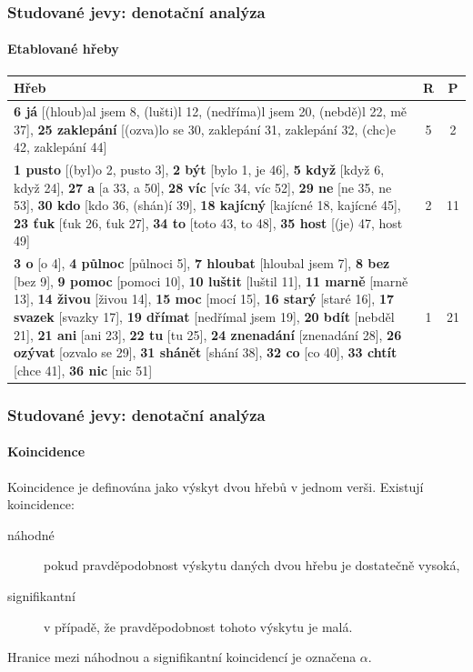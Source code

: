 \documentclass[12pt]{beamer}
\begin{document}
\begin{frame}
	\frametitle{Studované jevy: denotační analýza}
	\framesubtitle{Etablované hřeby}

	\vspace{-15pt}
	\begin{footnotesize}
		\begin {table}[H]
		\begin{center}
			\begin{tabular}{|p{10cm}|c|c|}
				\hline 
				\bfseries Hřeb & \bfseries R & \bfseries P \\ \hline
				\textbf{6 já} [(hloub)al jsem 8, (lušti)l 12, (nedříma)l jsem 20, (nebdě)l 22, mě 37], \textbf{25 zaklepání} [(ozva)lo se 30, zaklepání 31, zaklepání 32, (chc)e 42, zaklepání 44] 
				& 5 & 2 \\ \hline
				
				\textbf{1 pusto} [(byl)o 2, pusto 3], \textbf{2 být} [bylo 1, je 46], \textbf{5 když} [když 6, když 24], \textbf{27 a} [a 33, a 50], \textbf{28 víc} [víc 34, víc 52], \textbf{29 ne} [ne 35, ne 53], \textbf{30 kdo} [kdo 36, (shán)í 39], \textbf{18 kajícný} [kajícné 18, kajícné 45], \textbf{23 ťuk} [ťuk 26, ťuk 27], \textbf{34 to} [toto 43, to 48], \textbf{35 host} [(je) 47, host 49] 
				& 2 & 11\\ \hline
				
				\textbf{3 o} [o 4], \textbf{4 půlnoc} [půlnoci 5], \textbf{7 hloubat} [hloubal jsem 7], \textbf{8 bez} [bez 9], \textbf{9 pomoc} [pomoci 10], \textbf{10 luštit} [luštil 11], \textbf{11 marně} [marně 13], \textbf{14 živou} [živou 14], \textbf{15 moc} [mocí 15], \textbf{16 starý} [staré 16], \textbf{17 svazek} [svazky 17], \textbf{19 dřímat} [nedřímal jsem 19], \textbf{20 bdít} [nebděl 21], \textbf{21 ani} [ani 23], \textbf{22 tu} [tu 25], \textbf{24 znenadání} [znenadání 28], \textbf{26 ozývat} [ozvalo se 29], \textbf{31 shánět} [shání 38], \textbf{32 co} [co 40], \textbf{33 chtít} [chce 41], \textbf{36 nic} [nic 51]
				& 1 & 21 \\ \hline
		
			\end{tabular} 
		\end{center}
	\end{table}
	\end{footnotesize}
\end{frame}

\begin{frame}
	\frametitle{Studované jevy:  denotační analýza}
	\framesubtitle{Koincidence}

	Koincidence je definována jako výskyt dvou hřebů v jednom verši. Existují koincidence:
	
	\begin{description}
		\item[náhodné] pokud pravděpodobnost výskytu daných dvou hřebu je dostatečně vysoká,
		\item[signifikantní] v případě, že pravděpodobnost tohoto výskytu je malá.
	\end{description}

	Hranice mezi náhodnou a signifikantní koincidencí je označena $\alpha$.	

\end{frame}
\end{document}
